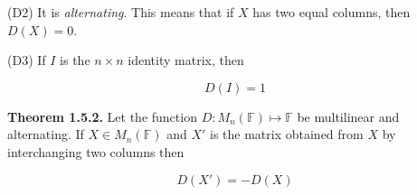 \documentclass[10pt,landscape]{article}
\begin{document}
\begin{multicols}{4}


(D2) It is \textit{alternating}. This means that if $X$ has two equal columns, then $D(X) = 0$.

(D3) If $I$ is the $n \times n$ identity matrix, then

$$
D(I) = 1
$$

\textbf{Theorem 1.5.2.} Let the function $D: M_n(\mathbb{F}) \mapsto \mathbb{F}$ be multilinear and alternating. If $X \in M_n(\mathbb{F})$ and $X'$ is the matrix obtained from $X$ by interchanging two columns then

$$
D(X') = -D(X)
$$











\end{multicols}
\end{document}
